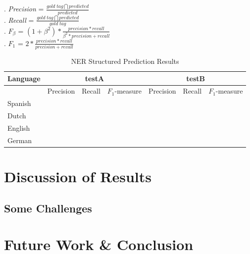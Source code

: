 \documentclass[11pt]{article}
\begin{document}
\ex. \emph{Precision} = $ \frac{gold\; tag \bigcap predicted}{predicted}$ \label{Precision}\\


\ex. \emph{Recall} = $ \frac{gold \;tag \bigcap predicted}{gold\; tag}$ \label{Recall}\\


\ex. $F_{\beta}$ = $ (1+\beta^2)*\frac{precision *recall}{\beta^2* precision + recall}$ \label{Fscore}\\

\ex. $F_1$ = $ 2*\frac{precision *recall}{precision + recall}$ \label{F1}\\




\begin{table}[h!]
\begin{tabular}{l |l| l| l| l| l| l}
 
\bf Language & \multicolumn{3}{c|}{ \bf testA}&\multicolumn{3}{c}{ \bf testB}\\\hline 
             & Precision & Recall & $F_1$-measure & Precision & Recall & $F_1$-measure \\ \hline
Spanish &       &          &     &          &               & \\
Dutch  &         &          &     &          &               &   \\
English &        &          &     &          &               &       \\
German &      &          &       &          &             & \\
\end{tabular}
\caption{NER Structured Prediction Results }
\label{table:Results}
\end{table}

\section{Discussion of Results}

\subsection*{Some Challenges} %


\section{Future Work \& Conclusion}






\end{document}

